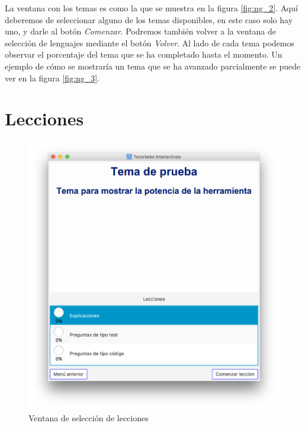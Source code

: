 \documentclass[]{article}
\begin{document}
La ventana con los temas es como la que se muestra en la figura \ref{fig:ng_2}. Aquí deberemos de seleccionar alguno de los temas disponibles, en este caso solo hay uno, y darle al botón \emph{Comenzar}. Podremos también volver a la ventana de selección de lenguajes mediante el botón \emph{Volver}. Al lado de cada tema podemos observar el porcentaje del tema que se ha completado hasta el momento. Un ejemplo de cómo se mostraría un tema que se ha avanzado parcialmente se puede ver en la figura \ref{fig:ng_3}.

\section{Lecciones} %

%
\begin{figure}[tbp]
\begin{center}
\includegraphics[scale=0.35,trim={50px 50px 50px 30px},clip]{l_1.png}
\end{center}
\caption{Ventana de selección de lecciones\label{fig:l_1}}
\end{figure}
%
%
\end{document}

